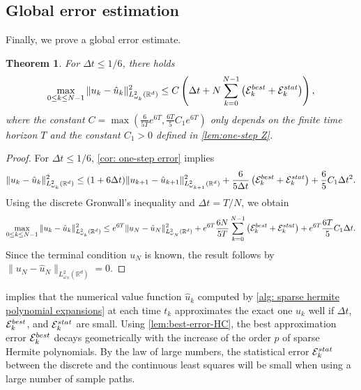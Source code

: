\documentclass[10pt,a4paper]{amsart}
\numberwithin{equation}{section}
\numberwithin{algorithm}{section}
\theoremstyle{plain}
\newtheorem{theorem}{Theorem}[section]
\theoremstyle{remark}
\newcommand{\R}{\mathbb{R}}
\begin{document}
\subsection{Global error estimation}
Finally, we prove a global error estimate.

\begin{theorem} \label{thm: global error}
For $\Delta t \le 1/6$, there holds
    \begin{equation*}
        \max_{0\le k\le N-1} \|u_k - \hat{u}_k\|_{{L}^2_{\omega_k}(\R^d)}^2 \le C\left( \Delta t +  N\sum_{k=0}^{N-1} \left( \mathcal{E}_k^{\rm best} + \mathcal{E}_k^{\rm stat} \right) \right),
    \end{equation*}
    where the constant $C = \max\left(\frac{6}{5T}e^{6T}, \frac{6T}{5}C_1 e^{6T} \right)$ only depends on the finite time horizon $T$ and the constant $C_1>0$ defined in \cref{lem:one-step Z}.
\end{theorem}

\begin{proof}
    For $\Delta t\le 1/6$, \cref{cor: one-step error} implies
    \begin{equation*}
        \|u_k - \hat{u}_k\|_{{L}^2_{\omega_k}(\R^d)}^2 \le (1+6 \Delta t) \|u_{k+1} - \hat{u}_{k+1}\|_{{L}^2_{\omega_{k+1}}(\R^d)}^2 + \frac{6}{5\Delta t} \left( \mathcal{E}_k^{\rm best} + \mathcal{E}_k^{\rm stat} \right) + \frac{6}{5}C_1\Delta t^2.
    \end{equation*}
    Using the discrete Gronwall's inequality and $\Delta t = T/N$, we obtain
    \begin{equation*}
        \max_{0\le k\le N-1} \|u_k - \hat{u}_k\|_{{L}^2_{\omega_k}(\R^d)}^2 \le e^{6T} \|u_N - \hat{u}_N\|_{{L}^2_{\omega_N}(\R^d)}^2 + e^{6T} \frac{6N}{5T} \sum_{k=0}^{N-1} \left( \mathcal{E}_k^{\rm best} + \mathcal{E}_k^{\rm stat} \right) + e^{6T} \frac{6T}{5}C_1 \Delta t.
    \end{equation*}
    Since the terminal condition $u_N$ is known, the result follows by $\|u_N - \hat{u}_N\|_{{L}_{\omega_N}^2(\R^d)} = 0$.
\end{proof}

 implies that the numerical value function $\hat{u}_{k}$ computed by \cref{alg: sparse hermite polynomial expansions} at each time $t_k$ approximates the exact one ${u}_{k}$ well if $\Delta t$, $\mathcal{E}_k^{\rm best}$, and $\mathcal{E}_k^{\rm stat}$ are small. Using \cref{lem:best-error-HC}, the best approximation error $\mathcal{E}_k^{\rm best}$ decays geometrically with the increase of the order $p$ of sparse Hermite polynomials. By the law of large numbers, the statistical error
$\mathcal{E}_k^{\rm stat}$ between the discrete and the continuous least squares will be small when using a large number of sample paths.
\end{document}
